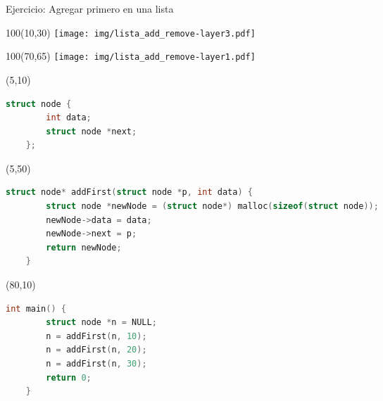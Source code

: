 \documentclass[aspectratio=169]{beamer}
\begin{document}
\begin{frame}[fragile]{Ejercicio: Agregar primero en una lista}
    \begin{textblock}{100}(10,30) \texttt{[image: img/lista\_add\_remove-layer3.pdf]} \end{textblock}
    \begin{textblock}{100}(70,65) \texttt{[image: img/lista\_add\_remove-layer1.pdf]} \end{textblock}
    \begin{textblock}{60}(5,10)
    \small
    \begin{lstlisting}[language=C,basicstyle=\ttfamily,columns=fullflexible]
    struct node {
        int data;
        struct node *next;
    };
    \end{lstlisting}
    \end{textblock}
    \begin{textblock}{60}(5,50)
    \small
    \begin{lstlisting}[language=C,basicstyle=\ttfamily,columns=fullflexible]
    struct node* addFirst(struct node *p, int data) {
        struct node *newNode = (struct node*) malloc(sizeof(struct node));
        newNode->data = data;
        newNode->next = p;
        return newNode;
    }
    \end{lstlisting}
    \end{textblock}
    \begin{textblock}{60}(80,10)
    \small
    \begin{lstlisting}[language=C,basicstyle=\ttfamily,columns=fullflexible]
    int main() {
        struct node *n = NULL;
        n = addFirst(n, 10);
        n = addFirst(n, 20);
        n = addFirst(n, 30);
        return 0;
    }
    \end{lstlisting}
    \end{textblock}
\end{frame}
\end{document}

